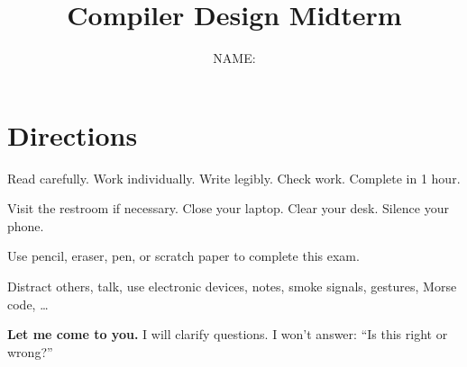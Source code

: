 \documentclass[addpoints,answers]{exam}
\title{Compiler Design Midterm}
\author{NAME: \underline{\hspace{10cm}}}
\date{}
\begin{document}
\maketitle

\section*{Directions}
Read carefully. Work individually. Write legibly. Check work. Complete in 1 hour.
\begin{description}[leftmargin=!,labelwidth=\widthof{\bfseries Beforehand}]
\item[Beforehand] Visit the restroom if necessary. Close your laptop. Clear your desk. Silence your phone.
\item[DO] Use pencil, eraser, pen, or scratch paper to complete this exam.
\item[DO NOT] Distract others, talk, use electronic devices, notes, smoke signals, gestures, Morse code, \ldots
\item[Confused?] \textbf{Let me come to you.} I will clarify questions. I won't answer: ``Is this right or wrong?''
\end{description}
\end{document}
